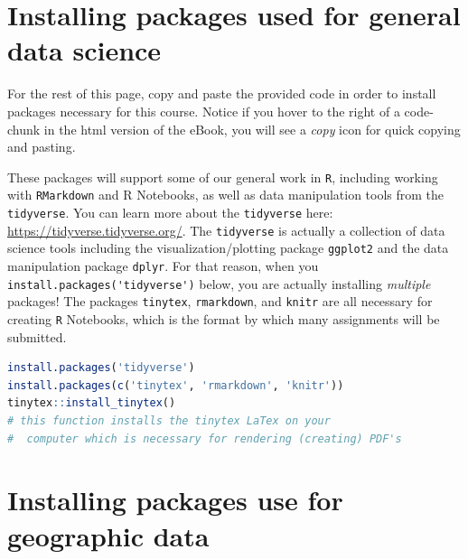 \documentclass[
]{book}
\newcommand{\passthrough}[1]{#1}
\begin{document}
\hypertarget{installing-packages-used-for-general-data-science}{%
\section*{Installing packages used for general data science}\label{installing-packages-used-for-general-data-science}}

For the rest of this page, copy and paste the provided code in order to install packages necessary for this course. Notice if you hover to the right of a code-chunk in the html version of the eBook, you will see a \emph{copy} icon for quick copying and pasting.

These packages will support some of our general work in \passthrough{\lstinline!R!}, including working with \passthrough{\lstinline!RMarkdown!} and R Notebooks, as well as data manipulation tools from the \passthrough{\lstinline!tidyverse!}. You can learn more about the \passthrough{\lstinline!tidyverse!} here: \url{https://tidyverse.tidyverse.org/}. The \passthrough{\lstinline!tidyverse!} is actually a collection of data science tools including the visualization/plotting package \passthrough{\lstinline!ggplot2!} and the data manipulation package \passthrough{\lstinline!dplyr!}. For that reason, when you \passthrough{\lstinline!install.packages('tidyverse')!} below, you are actually installing \emph{multiple} packages! The packages \passthrough{\lstinline!tinytex!}, \passthrough{\lstinline!rmarkdown!}, and \passthrough{\lstinline!knitr!} are all necessary for creating \passthrough{\lstinline!R!} Notebooks, which is the format by which many assignments will be submitted.

\begin{lstlisting}[language=R]
install.packages('tidyverse')   
install.packages(c('tinytex', 'rmarkdown', 'knitr')) 
tinytex::install_tinytex()  
# this function installs the tinytex LaTex on your
#  computer which is necessary for rendering (creating) PDF's 
\end{lstlisting}

\hypertarget{installing-packages-use-for-geographic-data}{%
\section*{Installing packages use for geographic data}\label{installing-packages-use-for-geographic-data}}
\end{document}
